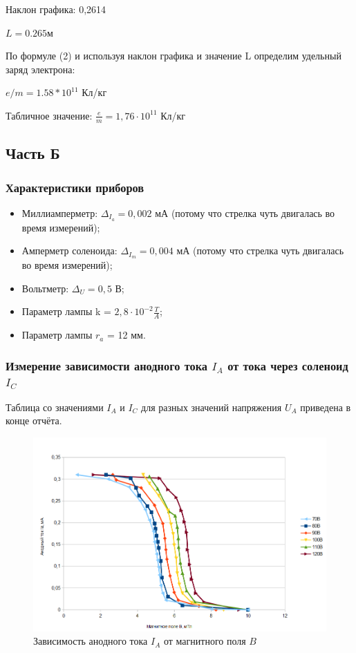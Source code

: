 \documentclass{article}
\begin{document}
Наклон графика: 0,2614

$L = 0.265 м$

По формуле (2) и используя наклон графика и значение L определим удельный заряд электрона:

$e/m = 1.58*10^{11}$ Кл/кг

Табличное значение: $\frac{e}{m} = 1,76 \cdot 10^{11}$ Кл/кг

\newpage

\subsection*{Часть Б}

\subsubsection*{Характеристики приборов}
\begin{itemize}
    \item Миллиамперметр: $\Delta_{I_a} = 0,002$ мА (потому что стрелка чуть двигалась во время измерений);
    \item Амперметр соленоида: $\Delta_{I_m} = 0,004$ мА (потому что стрелка чуть двигалась во время измерений);
    \item Вольтметр: $\Delta_U = 0,5$ В;
    \item Параметр лампы k = $2,8 \cdot 10^{-2} \frac{T}{A}$;
    \item Параметр лампы $r_a$ = 12 мм.
\end{itemize}

\subsubsection*{Измерение зависимости анодного тока $I_A$ от тока через соленоид $I_C$}
Таблица со значениями $I_A$ и $I_C$ для разных значений напряжения $U_A$ приведена в конце отчёта.

\begin{figure}[h]
    \centering
    \includegraphics[width=0.75\linewidth]{Screenshot_6.png}
    \caption{Зависимость анодного тока $I_A$ от магнитного поля $B$}
    \label{fig:placeholder}
\end{figure}
\end{document}
